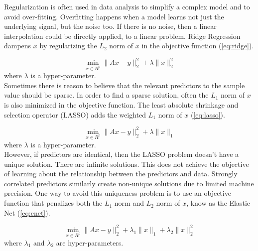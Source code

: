 \documentclass{article}
\begin{document}
\quad Regularization is often used in data analysis to simplify a complex model and to avoid over-fitting. Overfitting happens when a model learns not just the underlying signal, but the noise too. If there is no noise, then a linear interpolation could be directly applied, to a linear problem. Ridge Regression dampens $x$ by regularizing the $L_2$ norm of $x$ in the objective function (\ref{eq:ridge}). 

\begin{equation} \label{eq:ridge}
\min_{x\in R^p} \|Ax-y\|_2^2 + \lambda \|x\|_2^2
\end{equation}
where $\lambda$ is a hyper-parameter.\\

\quad Sometimes there is reason to believe that the relevant predictors to the sample value should be sparse. In order to find a sparse solution, often the $L_1$ norm of $x$ is also minimized in the objective function. The least absolute shrinkage and selection operator (LASSO) adds the weighted $L_1$ norm of $x$ (\ref{eq:lasso}). 

\begin{equation} \label{eq:lasso}
\min_{x\in R^p} \|Ax-y\|_2^2 + \lambda \|x\|_1
\end{equation}
where $\lambda$ is a hyper-parameter.\\

However, if predictors are identical, then the LASSO problem doesn't have a unique solution. There are infinite solutions. This does not achieve the objective of learning about the relationship between the predictors and data. Strongly correlated predictors similarly create non-unique solutions due to limited machine precision. One way to avoid this uniqueness problem is to use an objective function that penalizes both the $L_1$ norm and $L_2$ norm of $x$, know as the Elastic Net (\ref{eq:enet}).

\begin{equation} \label{eq:enet}
\min_{x\in R^p} \|Ax-y\|_2^2 + \lambda_1 \|x\|_1 + \lambda_2 \|x\|_2^2
\end{equation}
where $\lambda_1$ and $\lambda_2$ are hyper-parameters.\\
\end{document}
